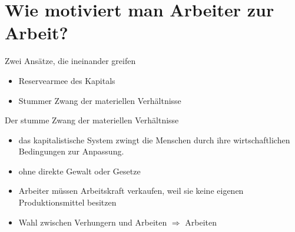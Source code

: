 \documentclass{beamer}
\begin{document}
\section{Wie motiviert man Arbeiter zur Arbeit?}
\begin{frame}{Zwei Ansätze, die ineinander greifen}
\begin{itemize}
 \item<1-> Reservearmee des Kapitals
 \item<2-> Stummer Zwang der materiellen Verhältnisse
\end{itemize}
\end{frame}
\begin{frame}{Der stumme Zwang der materiellen Verhältnisse}
\begin{itemize}
 \item das kapitalistische System zwingt die Menschen durch ihre wirtschaftlichen Bedingungen zur Anpassung.
 \item ohne direkte Gewalt oder Gesetze
 \item Arbeiter müssen Arbeitskraft verkaufen, weil sie keine eigenen Produktionsmittel besitzen
 \item Wahl zwischen Verhungern und Arbeiten  $\Rightarrow$ Arbeiten
\end{itemize}
\end{frame}
\end{document}
